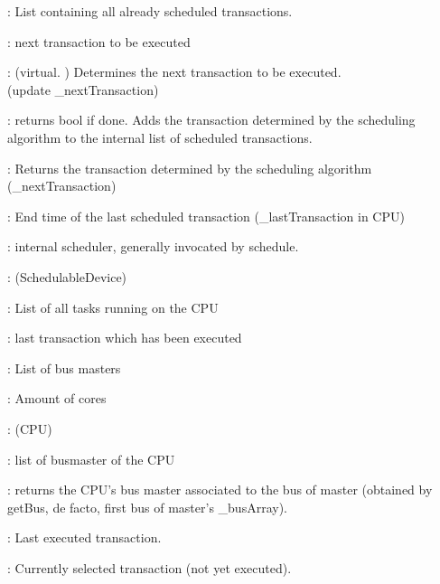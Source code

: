 \documentclass[a4paper,11pt]{article}
\newcommand{\bfont}{\fontseries{b}\selectfont}
\newcommand{\cod}[1]{{\ttfamily #1}}
\newcommand{\class}[2]{\par\vspace{1mm}\hspace{-5mm}\large\colorbox{file}{\textbullet\bfont\cod{#1}:} (\cod{#2})\par}
\newcommand{\method}[1]{\par\vspace{1mm}\hspace{-2mm}\colorbox{method}{\textopenbullet\bfont\cod{#1}:}}
\newcommand{\variable}[1]{\par\vspace{1mm}\hspace{-2mm}\colorbox{variable}{\textopenbullet\bfont\cod{#1}:}}
\begin{document}
\variable{\_transactList}	List containing all already scheduled transactions.

\variable{\_nextTransaction} next transaction to be executed

\method{schedule()} (virtual. ) Determines the next transaction to be executed.\\ (update \cod{\_nextTransaction})

\method{addTransaction(iTransToBeAdded)} returns bool if done. Adds the transaction determined by the scheduling algorithm to the internal list of scheduled transactions.

\method{getNextTransaction()} Returns the transaction determined by the scheduling algorithm (\cod{\_nextTransaction})


\variable{\_endSchedule} End time of the last scheduled transaction (\cod{\_lastTransaction} in CPU)

\variable{\_scheduler} internal scheduler, generally invocated by \cod{schedule}.

\class{CPU}{SchedulableDevice}

\variable{\_taskList} List of all tasks running on the CPU

\variable{\_lastTransaction} last transaction which has been executed

\variable{\_busMasterList} List of bus masters

\variable{amountOfCore} Amount of cores

\class{SingleCoreCPU}{CPU}

\variable{\_busMasterList} list of busmaster of the CPU
	
\method{getMasterForBus(master)} returns the CPU's bus master associated to the bus of master (obtained by getBus, de facto, first bus of master's \cod{\_busArray}).

\variable{\_lastTransaction} Last executed transaction.

\variable{\_nextTransaction} Currently selected transaction (not yet executed).
\end{document}
